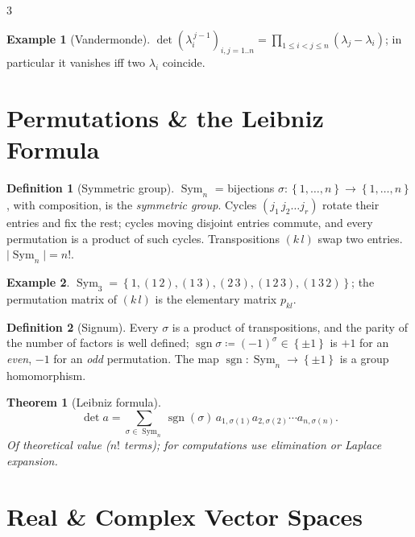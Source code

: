 \documentclass[10pt,a4paper,landscape]{article}
\theoremstyle{definition}
\newtheorem{defn}{Definition}[section]
\newtheorem{exm}{Example}[section]
\theoremstyle{plain}
\newtheorem{thm}{Theorem}[section]
\theoremstyle{remark}
\newcommand{\abs}[1]{\lvert #1 \rvert}
\newcommand{\set}[1]{\left\{ #1 \right\}}
\newcommand{\deq}{\coloneqq}
\DeclareMathOperator{\Sym}{Sym}
\DeclareMathOperator{\sgn}{sgn}
\begin{document}
\begin{multicols*}{3}
\begin{exm}[Vandermonde]
$\det \left( \lambda_i^{\,j-1} \right)_{i,j=1..n} = \prod_{1 \le i < j \le n} (\lambda_j - \lambda_i)$; in particular it vanishes iff two $\lambda_i$ coincide.
\end{exm}

\section{Permutations \& the Leibniz Formula}

\begin{defn}[Symmetric group]
$\Sym_n$ = bijections $\sigma: \set{1, \dots, n} \to \set{1, \dots, n}$, with composition, is the \emph{symmetric group}. Cycles $(j_1\, j_2 \dots j_r)$ rotate their entries and fix the rest; cycles moving disjoint entries commute, and every permutation is a product of such cycles. Transpositions $(k\, l)$ swap two entries. $\abs{\Sym_n} = n!$.
\end{defn}

\begin{exm}
$\Sym_3 = \set{1, (1\,2), (1\,3), (2\,3), (1\,2\,3), (1\,3\,2)}$; the permutation matrix of $(k\, l)$ is the elementary matrix $p_{kl}$.
\end{exm}

\begin{defn}[Signum]
Every $\sigma$ is a product of transpositions, and the parity of the number of factors is well defined; $\sgn \sigma \deq (-1)^{\sigma} \in \set{\pm 1}$ is $+1$ for an \emph{even}, $-1$ for an \emph{odd} permutation. The map $\sgn: \Sym_n \to \set{\pm 1}$ is a group homomorphism.
\end{defn}

\begin{thm}[Leibniz formula]
\[
\det a = \sum_{\sigma \in \Sym_n} \sgn(\sigma)\, a_{1,\sigma(1)} a_{2,\sigma(2)} \cdots a_{n,\sigma(n)} .
\]
Of theoretical value ($n!$ terms); for computations use elimination or Laplace expansion.
\end{thm}

\section{Real \& Complex Vector Spaces}


\end{multicols*}
\end{document}
